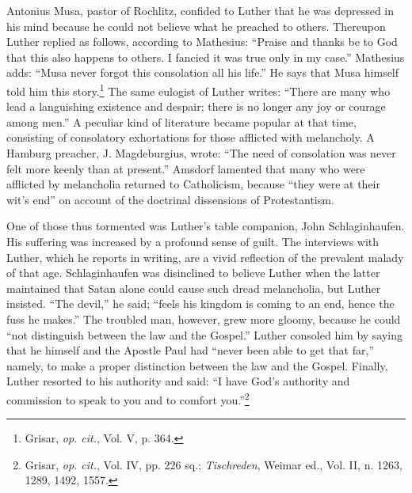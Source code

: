 Antonius Musa, pastor of Rochlitz, confided to Luther that he
was depressed in his mind because he could not believe what he
preached to others. Thereupon Luther replied as follows, according
to Mathesius: “Praise and thanks be to God that this also happens to
others. I fancied it was true only in my case.” Mathesius adds: “Musa
never forgot this consolation all his life.” He says that Musa himself
told him this story.\footnote{Grisar, \textit{op. cit.}, Vol. V, p. 364.}
 The same eulogist of Luther writes: “There are
many who lead a languishing existence and despair; there is no longer
any joy or courage among men.” A peculiar kind of literature became
popular at that time, consisting of consolatory exhortations for
those afflicted with melancholy. A Hamburg preacher, J. Magdeburgius,
wrote: “The need of consolation was never felt more keenly
than at present.” Amsdorf lamented that many who were afflicted
by melancholia returned to Catholicism, because “they were at
their wit’s end” on account of the doctrinal dissensions of Protestantism.

One of those thus tormented was Luther’s table companion, John
Schlaginhaufen. His suffering was increased by a profound sense of
guilt. The interviews with Luther, which he reports in writing, are
a vivid reflection of the prevalent malady of that age. Schlaginhaufen
was disinclined to believe Luther when the latter maintained that
Satan alone could cause such dread melancholia, but Luther insisted.
“The devil,” he said; “feels his kingdom is coming to an end, hence the
fuss he makes.” The troubled man, however, grew more gloomy,
because he could “not distinguish between the law and the Gospel.”
Luther consoled him by saying that he himself and the Apostle Paul
had “never been able to get that far,” namely, to make a proper distinction
between the law and the Gospel. Finally, Luther resorted to
his authority and said: “I have God’s authority and commission to
speak to you and to comfort you.”\footnote
{Grisar, \textit{op. cit.}, Vol. IV, pp. 226 sq.; \textit{Tischreden}, Weimar ed., Vol. II, n. 1263, 1289,
1492, 1557.}
